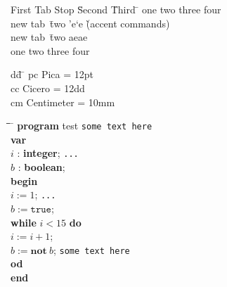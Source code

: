 \documentclass{article}
\begin{document}
\begin{tabbing}
  First Tab Stop \= Second \= Third \= \kill
  one \> two \> three \> four \\
  new tab\ \= two \> \a'{e}\a`{e} \`(accent commands)\\
  new tab\ \= two \> aeae \\
  one \> two \> three \> four
\end{tabbing}

\newcommand\lenrule[1]{\makebox[#1]{%
    \rule{.4pt}{4pt}\hrulefill\rule{.4pt}{4pt}}}
\begin{tabbing}
  dd\quad \= \hspace{.55\linewidth} \= \kill
  pc \> Pica = 12pt \> \lenrule{1pc} \\
  cc \> Cicero = 12dd \> \lenrule{1cc} \\
  cm \> Centimeter = 10mm \> \lenrule{1cm} \\
\end{tabbing}

\begin{tabbing}
    \quad \= \quad \= \quad \= \hspace{5cm} \= \kill
    \textbf{program} test \> \> \> \> \texttt{some text here} \\
    \textbf{var} \\
    \> $i$ : \textbf{integer}; \> \> \> \texttt{...} \\
    \> $b$ : \textbf{boolean}; \\
    \textbf{begin} \\
    \> $i:=1$; \> \> \> \texttt{...} \\
    \> $b:=\texttt{true}$; \\
    \> \textbf{while} $i<15$ \textbf{do} \\
    \> \> $i:=i+1$; \\
    \> \> $b:=\textbf{not}\ b$; \> \> \texttt{some text here} \\
    \> \textbf{od} \\
    \textbf{end}
\end{tabbing}
\end{document}
